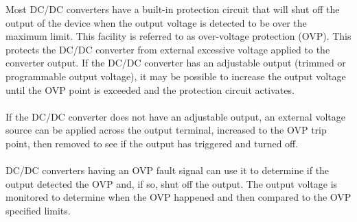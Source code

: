 Most DC/DC converters have a built-in protection circuit that will shut off the output of the device when the output voltage is detected to be over the maximum limit. This facility is referred to as over-voltage protection (OVP). This protects the DC/DC converter from external excessive voltage applied to the converter output. If the DC/DC converter has an adjustable output (trimmed or programmable output voltage), it may be possible to increase the output voltage until the OVP point is exceeded and the protection circuit activates.
\\ \\
If the DC/DC converter does not have an adjustable output, an external voltage source can be applied across the output terminal, increased to the OVP trip point, then removed to see if the output has triggered and turned off.
\\ \\
DC/DC converters having an OVP fault signal can use it to determine if the output detected the OVP and, if so, shut off the output. The output voltage is monitored to determine when the OVP happened and then compared to the OVP specified limits.
\\ \\

